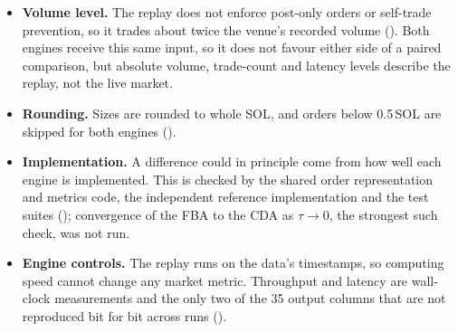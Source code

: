 \begin{itemize}
  \item \textbf{Volume level.} The replay does not enforce post-only orders
  or self-trade prevention, so it trades about twice the venue's recorded
  volume (). Both engines receive this same input, so
  it does not favour either side of a paired comparison, but absolute
  volume, trade-count and latency levels describe the replay, not the live
  market.
  \item \textbf{Rounding.} Sizes are rounded to whole SOL, and orders below
  0.5\,SOL are skipped for both engines ().
  \item \textbf{Implementation.} A difference could in principle come from
  how well each engine is implemented. This is checked by the shared order
  representation and metrics code, the independent reference implementation
  and the test suites (); convergence of the FBA to the
  CDA as $\tau \to 0$, the strongest such check, was not run.
  \item \textbf{Engine controls.} The replay runs on the data's timestamps,
  so computing speed cannot change any market metric. Throughput and
  latency are wall-clock measurements and the only two of the 35 output
  columns that are not reproduced bit for bit across runs
  ().
\end{itemize}

